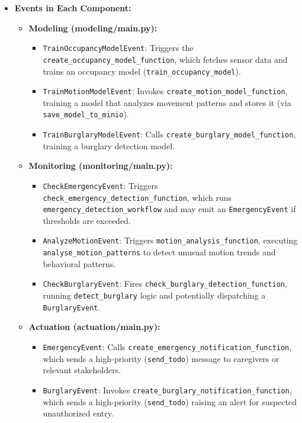 \documentclass[A4,10pt]{article}
\begin{document}
\begin{itemize}
    \item \textbf{Events in Each Component:}
    \begin{itemize}
        \item \textbf{Modeling (modeling/main.py):}
        \begin{itemize}
            \item \texttt{TrainOccupancyModelEvent}: Triggers the \texttt{create\_occupancy\_model\_function}, which fetches sensor data and trains an occupancy model (\texttt{train\_occupancy\_model}).  
            \item \texttt{TrainMotionModelEvent}: Invokes \texttt{create\_motion\_model\_function}, training a model that analyzes movement patterns and stores it (via \texttt{save\_model\_to\_minio}).  
            \item \texttt{TrainBurglaryModelEvent}: Calls \texttt{create\_burglary\_model\_function}, training a burglary detection model.
        \end{itemize}

        \item \textbf{Monitoring (monitoring/main.py):}
        \begin{itemize}
            \item \texttt{CheckEmergencyEvent}: Triggers \texttt{check\_emergency\_detection\_function}, which runs \texttt{emergency\_detection\_workflow} and may emit an \texttt{EmergencyEvent} if thresholds are exceeded.
            \item \texttt{AnalyzeMotionEvent}: Triggers \texttt{motion\_analysis\_function}, executing \texttt{analyse\_motion\_patterns} to detect unusual motion trends and behavioral patterns.
            \item \texttt{CheckBurglaryEvent}: Fires \texttt{check\_burglary\_detection\_function}, running \texttt{detect\_burglary} logic and potentially dispatching a \texttt{BurglaryEvent}.
        \end{itemize}

        \item \textbf{Actuation (actuation/main.py):}
        \begin{itemize}
            \item \texttt{EmergencyEvent}: Calls \texttt{create\_emergency\_notification\_function}, which sends a high-priority (\texttt{send\_todo}) message to caregivers or relevant stakeholders.
            \item \texttt{BurglaryEvent}: Invokes \texttt{create\_burglary\_notification\_function}, which sends a high-priority (\texttt{send\_todo}) raising an alert for suspected unauthorized entry.
        \end{itemize}
    \end{itemize}


\end{itemize}
\end{document}
